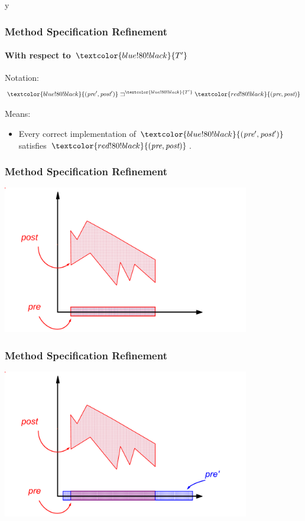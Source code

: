 \if y\MAKEHANDOUTS \documentclass[t,compress,landscape,handout]{beamer}
\newcommand{\RED}[1]{\textcolor{red!80!black}{#1}}
\newcommand{\BLUE}[1]{\textcolor{blue!80!black}{#1}}
\newcommand{\BLUETP}{\BLUE{\ensuremath{T'}}}
\newcommand{\pre}{{\textit{pre}}}
\newcommand{\post}{{\textit{post}}}
\begin{document}
\begin{frame}
\frametitle{Method Specification Refinement}
\framesubtitle{With respect to $\BLUETP$}

Notation:
\begin{displaymath}
\BLUE{(\pre',\post')} \sqsupset^{\BLUETP} \RED{(\pre,\post)}
\end{displaymath}

Means:
\begin{itemize}
\item
Every correct implementation of $\BLUE{(\pre',\post')}$ satisfies
$\RED{(\pre,\post)}$.
\end{itemize}
\end{frame}

\begin{frame}
\frametitle{Method Specification Refinement}
\includegraphics[width=4.25in]{meth-refine1}
\end{frame}

\begin{frame}
\frametitle{Method Specification Refinement}
\transdissolve[duration=0.2]
\includegraphics[width=4.25in]{meth-refine2}
\end{frame}
\end{document}
